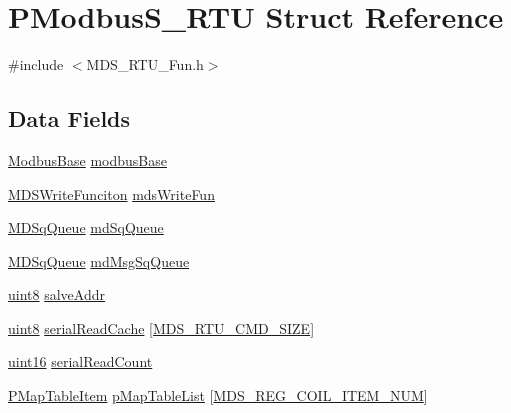\hypertarget{struct_p_modbus_s___r_t_u}{}\section{P\+Modbus\+S\+\_\+\+R\+TU Struct Reference}
\label{struct_p_modbus_s___r_t_u}


{\ttfamily \#include $<$M\+D\+S\+\_\+\+R\+T\+U\+\_\+\+Fun.\+h$>$}

\subsection*{Data Fields}
\begin{DoxyCompactItemize}
\item 
\mbox{\hyperlink{_m_d___r_t_u___tool_8h_a6888030ca3addf2a416ddff791eb3670}{Modbus\+Base}} \mbox{\hyperlink{struct_p_modbus_s___r_t_u_a86bbfbee0dc7ed3234f09bafd11ea782}{modbus\+Base}}
\item 
\mbox{\hyperlink{_m_d_s___r_t_u___fun_8h_a9b7cc9da2b67c004a6604dbbbb180ae3}{M\+D\+S\+Write\+Funciton}} \mbox{\hyperlink{struct_p_modbus_s___r_t_u_acff5bc6c8776ebb3ededcb45c30ee94c}{mds\+Write\+Fun}}
\item 
\mbox{\hyperlink{_m_d___r_t_u___queue_8h_ad27ae911ca5f7b5ff69b51db46342bb4}{M\+D\+Sq\+Queue}} \mbox{\hyperlink{struct_p_modbus_s___r_t_u_af2a6c5c4873cee1496c84a48b320302d}{md\+Sq\+Queue}}
\item 
\mbox{\hyperlink{_m_d___r_t_u___queue_8h_ad27ae911ca5f7b5ff69b51db46342bb4}{M\+D\+Sq\+Queue}} \mbox{\hyperlink{struct_p_modbus_s___r_t_u_aafffee118f7f8bb2e9c75a0c6114baee}{md\+Msg\+Sq\+Queue}}
\item 
\mbox{\hyperlink{_m_d___r_t_u___type_8h_adde6aaee8457bee49c2a92621fe22b79}{uint8}} \mbox{\hyperlink{struct_p_modbus_s___r_t_u_a7125a1d1d748e89c92e6ab3cdf2c7c9f}{salve\+Addr}}
\item 
\mbox{\hyperlink{_m_d___r_t_u___type_8h_adde6aaee8457bee49c2a92621fe22b79}{uint8}} \mbox{\hyperlink{struct_p_modbus_s___r_t_u_a5e87b8f71c7e3e5622f156495ff5a982}{serial\+Read\+Cache}} \mbox{[}\mbox{\hyperlink{_m_d___r_t_u___config_8h_a97b37dd5cedad8ef355410106c692d8c}{M\+D\+S\+\_\+\+R\+T\+U\+\_\+\+C\+M\+D\+\_\+\+S\+I\+ZE}}\mbox{]}
\item 
\mbox{\hyperlink{_m_d___r_t_u___type_8h_a05f6b0ae8f6a6e135b0e290c25fe0e4e}{uint16}} \mbox{\hyperlink{struct_p_modbus_s___r_t_u_a255aad6bfe97d5e239d9beaad7e348e4}{serial\+Read\+Count}}
\item 
\mbox{\hyperlink{struct_p_map_table_item}{P\+Map\+Table\+Item}} \mbox{\hyperlink{struct_p_modbus_s___r_t_u_ae148caff48502e95c879b464c375667b}{p\+Map\+Table\+List}} \mbox{[}\mbox{\hyperlink{_m_d___r_t_u___config_8h_a67035c6d5b68cdac31d9fd90bff28d49}{M\+D\+S\+\_\+\+R\+E\+G\+\_\+\+C\+O\+I\+L\+\_\+\+I\+T\+E\+M\+\_\+\+N\+UM}}\mbox{]}

\end{DoxyCompactItemize}
